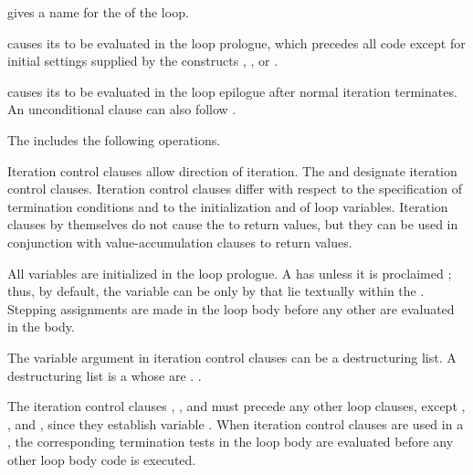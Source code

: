 \endsubsubsubsection%

 
\beginlist
\itemitem{--}  gives a name for the 
  of the loop.
                                       
\itemitem{--}  causes its  to be
  evaluated in the loop prologue, which precedes all  code
  except for initial settings supplied by the constructs ,
  , or .
 
\itemitem{--}   causes its  to
  be evaluated in the loop epilogue after normal iteration terminates.
  An unconditional clause can also follow .
 
\endlist

\endsubsubsubsection%

\endsubsubsection%

\beginsubsubsection{{\LoopFacility}}
The {\LoopFacility} includes the following operations.
 
 
\beginlist
{}

Iteration control clauses allow direction of  iteration.
The   and 
designate iteration control clauses.
Iteration control clauses differ with respect to the specification of
termination conditions and to the initialization and 
of loop variables.  Iteration clauses by themselves
do not cause the {\LoopFacility} to return values, but they
can be used in conjunction with value-accumulation clauses to
return values.  
 
All variables are initialized in the loop prologue.  
A   has 
unless it is proclaimed ;
thus, by default, the variable can be  only by  
that lie textually within the .
Stepping assignments are made in the loop body before any other 
are evaluated in the body.  
 
The variable argument in iteration control clauses can be a 
destructuring list.  A destructuring list
is a  whose   are  .
\Seesection\Destructuring.
 
The iteration control clauses , ,  and  
must precede any other loop clauses, except
  , , and ,
since they establish variable .  
When iteration control clauses are
used in a ,
the corresponding
termination tests in the loop body are evaluated
before any other loop body code is executed.
 
